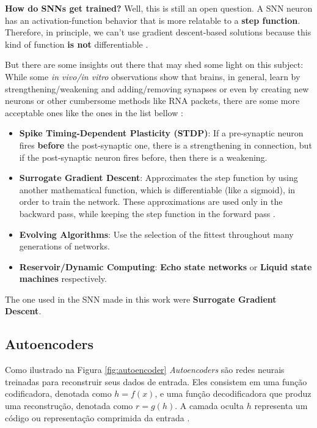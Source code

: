 		\par \textbf{How do SNNs get trained?} Well, this is still an open question. A SNN neuron has an activation-function behavior that is more relatable to a \textbf{step function}. Therefore, in principle, we can't use gradient descent-based solutions because this kind of function \textbf{is not} differentiable \cite{kasabov2019time}.
		
		\par But there are some insights out there that may shed some light on this subject: While some \textit{in vivo/in vitro} observations show that brains, in general, learn by strengthening/weakening and adding/removing synapses or even by creating new neurons or other cumbersome methods like RNA packets, there are some more acceptable ones like the ones in the list bellow \cite{kasabov2019time}:
		
		\begin{itemize}
			\item \textbf{Spike Timing-Dependent Plasticity (STDP)}: If a pre-synaptic neuron fires \textbf{before} the post-synaptic one, there is a strengthening in connection, but if the post-synaptic neuron fires before, then there is a weakening.
			\item \textbf{Surrogate Gradient Descent}: Approximates the step function by using another mathematical function, which is differentiable (like a sigmoid), in order to train the network. These approximations are used only in the backward pass, while keeping the step function in the forward pass \cite{kasabov2019time}.
			\item \textbf{Evolving Algorithms}: Use the selection of the fittest throughout many generations of networks.
			\item \textbf{Reservoir/Dynamic Computing}: \textbf{Echo state networks} or \textbf{Liquid state machines} respectively.
		\end{itemize}
		
		\par The one used in the SNN made in this work were \textbf{Surrogate Gradient Descent}.
	
		\subsection{Autoencoders}
		
			\par Como ilustrado na Figura \ref{fig:autoencoder} \textit{Autoencoders} são redes neurais treinadas para reconstruir seus dados de entrada. Eles consistem em uma função codificadora, denotada como $h = f(x)$, e uma função decodificadora que produz uma reconstrução, denotada como $r = g(h)$. A camada oculta $h$ representa um código ou representação comprimida da entrada \cite{Goodfellow-et-al-2016}. \newline
			
